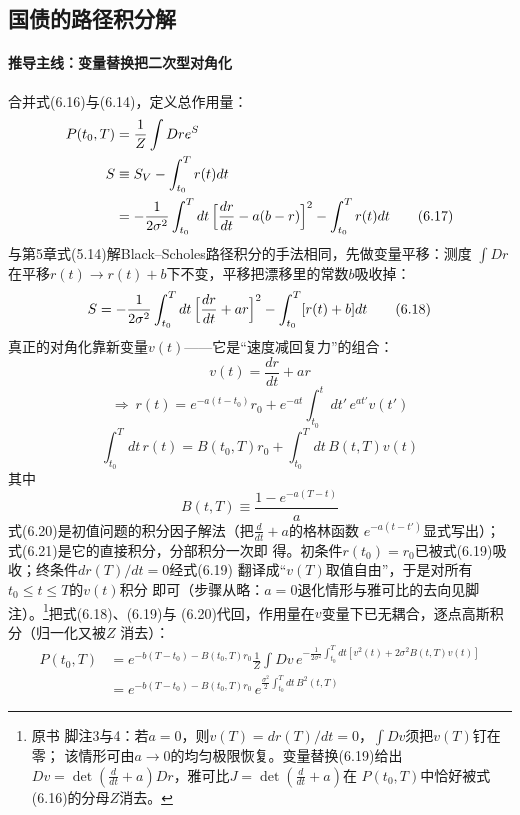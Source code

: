 \subsection*{国债的路径积分解}

\paragraph{推导主线：变量替换把二次型对角化}
合并式(6.16)与(6.14)，定义总作用量：
\begin{align*}
P(t_0,T)&=\frac{1}{Z}\int Dre^{S}\\
S&\equiv S_V-\int_{t_0}^{T}r(t)dt\\
&=-\frac{1}{2\sigma^2}\int_{t_0}^{T}dt\,
\Bigl[\frac{dr}{dt}-a(b-r)\Bigr]^2-\int_{t_0}^{T}r(t)dt
\tag{6.17}
\end{align*}
与第5章式(5.14)解Black--Scholes路径积分的手法相同，先做变量平移：测度
$\int Dr$在平移$r(t)\to r(t)+b$下不变，平移把漂移里的常数$b$吸收掉：
\begin{equation*}
S=-\frac{1}{2\sigma^2}\int_{t_0}^{T}dt\,
\Bigl[\frac{dr}{dt}+ar\Bigr]^2-\int_{t_0}^{T}[r(t)+b]dt
\tag{6.18}
\end{equation*}
真正的对角化靠新变量$v(t)$——它是“速度减回复力”的组合：
\begin{equation*}
v(t)=\frac{dr}{dt}+ar
\tag{6.19}
\end{equation*}
\begin{equation*}
\Rightarrow\ r(t)=e^{-a(t-t_0)}r_0+e^{-at}\int_{t_0}^{t}dt'\,e^{at'}v(t')
\tag{6.20}
\end{equation*}
\begin{equation*}
\int_{t_0}^{T}dt\,r(t)=B(t_0,T)r_0+\int_{t_0}^{T}dt\,B(t,T)v(t)
\tag{6.21}
\end{equation*}
其中
\begin{equation*}
B(t,T)\equiv\frac{1-e^{-a(T-t)}}{a}
\end{equation*}
式(6.20)是初值问题的积分因子解法（把$\frac{d}{dt}+a$的格林函数
$e^{-a(t-t')}$显式写出）；式(6.21)是它的直接积分，分部积分一次即
得。初条件$r(t_0)=r_0$已被式(6.19)吸收；终条件$dr(T)/dt=0$经式(6.19)
翻译成“$v(T)$取值自由”，于是对所有$t_0\leq t\leq T$的$v(t)$积分
即可（步骤从略：$a=0$退化情形与雅可比的去向见脚注）。\footnote{原书
脚注3与4：若$a=0$，则$v(T)=dr(T)/dt=0$，$\int Dv$须把$v(T)$钉在零；
该情形可由$a\to0$的均匀极限恢复。变量替换(6.19)给出
$Dv=\det(\frac{d}{dt}+a)Dr$，雅可比$J=\det(\frac{d}{dt}+a)$在
$P(t_0,T)$中恰好被式(6.16)的分母$Z$消去。}把式(6.18)、(6.19)与
(6.20)代回，作用量在$v$变量下已无耦合，逐点高斯积分（归一化又被$Z$
消去）：
\begin{align*}
P(t_0,T)&=e^{-b(T-t_0)-B(t_0,T)r_0}\frac{1}{Z}\int Dv\,
e^{-\frac{1}{2\sigma^2}\int_{t_0}^{T}dt[v^2(t)+2\sigma^2B(t,T)v(t)]}\\
&=e^{-b(T-t_0)-B(t_0,T)r_0}\,e^{\frac{\sigma^2}{2}\int_{t_0}^{T}dt\,B^2(t,T)}
\tag{6.22}
\end{align*}
